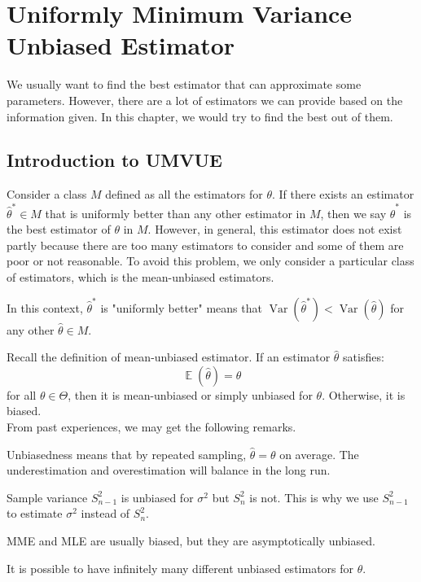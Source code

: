 \documentclass{huhtakm-template-book-v2}
\DeclareMathOperator{\E}{\mathbb{E}}
\DeclareMathOperator{\Var}{Var}
\begin{document}
\chapter{Uniformly Minimum Variance Unbiased Estimator}
We usually want to find the best estimator that can approximate some parameters. However, there are a lot of estimators we can provide based on the information given. In this chapter, we would try to find the best out of them.
\section{Introduction to UMVUE}
Consider a class $M$ defined as all the estimators for $\theta$. If there exists an estimator $\hat{\theta}^{*}\in M$ that is uniformly better than any other estimator in $M$, then we say $\hat{\theta}^{*}$ is the best estimator of $\theta$ in $M$. However, in general, this estimator does not exist partly because there are too many estimators to consider and some of them are poor or not reasonable. To avoid this problem, we only consider a particular class of estimators, which is the mean-unbiased estimators.
\begin{rem}
	In this context, $\hat{\theta}^{*}$ is "uniformly better" means that $\Var(\hat{\theta}^{*})<\Var(\hat{\theta})$ for any other $\hat{\theta}\in M$.
\end{rem}
Recall the definition of mean-unbiased estimator. If an estimator $\hat{\theta}$ satisfies:
\begin{equation*}
	\E(\hat{\theta})=\theta
\end{equation*}
for all $\theta\in\Theta$, then it is mean-unbiased or simply unbiased for $\theta$. Otherwise, it is biased.\\
From past experiences, we may get the following remarks.
\begin{rem}
	Unbiasedness means that by repeated sampling, $\hat{\theta}=\theta$ on average. The underestimation and overestimation will balance in the long run.
\end{rem}
\begin{rem}
	Sample variance $S_{n-1}^{2}$ is unbiased for $\sigma^{2}$ but $S_{n}^{2}$ is not. This is why we use $S_{n-1}^{2}$ to estimate $\sigma^{2}$ instead of $S_{n}^{2}$.
\end{rem}
\begin{rem}
	MME and MLE are usually biased, but they are asymptotically unbiased.
\end{rem}
\begin{rem}
	It is possible to have infinitely many different unbiased estimators for $\theta$.
\end{rem}
\end{document}

